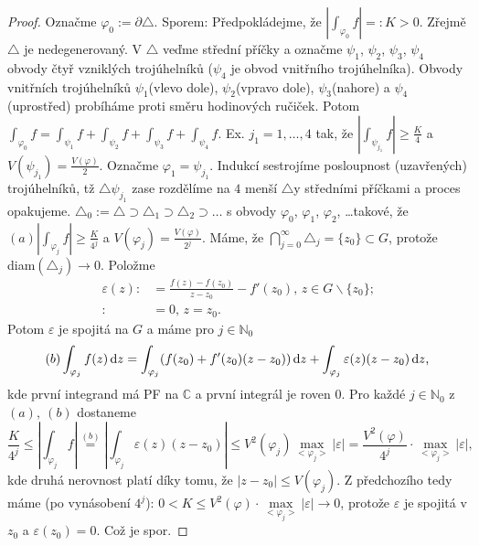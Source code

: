 \begin{proof}
Označme $\varphi_0:=\partial\triangle$. Sporem: Předpokládejme, že $|\int_{\varphi_0}f|=:K>0$. Zřejmě $\triangle$ je nedegenerovaný. V  $\triangle$ veďme střední příčky a označme $\psi_1$, $\psi_2$, $\psi_3$, $\psi_4$ obvody čtyř vzniklých trojúhelníků ($\psi_4$ je obvod vnitřního trojúhelníka). Obvody vnitřních trojúhelníků $\psi_1$(vlevo dole),  $\psi_2$(vpravo dole), $\psi_3$(nahore) a  $\psi_4$(uprostřed) probíháme proti směru hodinových ručiček.
Potom $\int_{\varphi_0}f=\int_{\psi_1}f+\int_{\psi_2}f+\int_{\psi_3}f+\int_{\psi_4}f$. Ex. $j_1=1, \ldots, 4$ tak, že $|\int_{\psi_{j_1}}f|\ge \frac{K}{4}$ a $V({\psi_{j_1}})= \frac{V(\varphi)}{2}$.
Označme $\varphi_1=\psi_{j_1}$. Indukcí sestrojíme posloupnost (uzavřených) trojúhelníků, tž $\triangle \psi_{j_1}$ zase rozdělíme na $4$ menší $\triangle$y středními příčkami a proces opakujeme.
$\triangle_0:=\triangle \supset \triangle_1 \supset \triangle_2 \supset \ldots$ s obvody $\varphi_0$, $\varphi_1$, $\varphi_2$, \ldots takové, že $(a) |\int_{\varphi_j}f|\ge \frac{K}{4^j}$ a $V({\varphi_j})= \frac{V(\varphi)}{2^j}$. Máme, že $\bigcap\limits_{j=0}^\infty \triangle_j=\{z_0\} \subset G$, %
protože diam$(\triangle_j)\rightarrow 0$. Položme
$$\begin{aligned}
\varepsilon(z): &= \frac{f(z)-f(z_0)}{z-z_0}-f'(z_0) \text{, } z \in G \backslash \{z_0\} \text{;} \\ %
: &= 0  \text{, } z=z_0 \text{.}
\end{aligned}
$$
Potom $\varepsilon$ je spojitá na $G$ a máme pro $j \in \mathbb{N}_0$
$$
(b) \int_{\varphi_j}f(z) \mathop{}\!\mathrm{d} z = \int_{\varphi_j}(f(z_0)+f'(z_0)(z-z_0)) \mathop{}\!\mathrm{d} z + \int_{\varphi_j}\varepsilon(z)(z-z_0) \mathop{}\!\mathrm{d} z \text{,}
$$
kde první integrand má PF na $\mathbb{C}$ a první integrál je roven $0$. Pro každé $j \in \mathbb{N}_0$ z $(a),\ (b)$ dostaneme
$$
\frac{K}{4^j} \le \left| \int_{\varphi_j}f\right|\stackrel{(b)}{=} \left|\int_{\varphi_j}\varepsilon(z)(z-z_0)\right| \le V^2(\varphi_j) \max_{<\varphi_j>}|\varepsilon|=\frac{V^2(\varphi)}{4^j}\cdot \max_{<\varphi_j>}|\varepsilon| \text{,}
$$
kde druhá nerovnost platí díky tomu, že $|z-z_0| \le V(\varphi_j)$. Z předchozího tedy máme (po vynásobení $4^j$): $0<K \le V^2(\varphi) \cdot \max\limits_{<\varphi_j>}|\varepsilon| \rightarrow 0$, protože $\varepsilon$ je spojitá v $z_0$ a $\varepsilon(z_0)=0$. Což je spor.
\end{proof}

